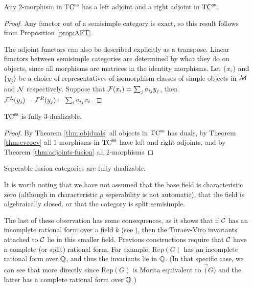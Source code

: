 \documentclass{amsart}
\begin{document}
\begin{theorem} \label{thm:adjoints-fusion}
Any $2$-morphism in ${\mathrm{TC}^{\text{ss}}}$ has a left adjoint and a right adjoint in ${\mathrm{TC}^{\text{ss}}}$.
\end{theorem}
\begin{proof}
Any functor out of a semisimple category is exact, so this result follows from Proposition \ref{prop:AFT}.

The adjoint functors can also be described explicitly as a transpose.  Linear functors between semisimple categories are determined by what they do on objects, since all morphisms are matrices in the identity morphisms.  Let $\{x_i\}$ and $\{y_j\}$ be a choice of representatives of isomorphism classes of simple objects in $\mathcal M$ and $\mathcal N$ respectively.  Suppose that $\mathcal F(x_i) = \sum_j a_{ij} y_j$, then $\mathcal F^L(y_j) = \mathcal F^R(y_j) = \sum_i a_{ij} x_i$. 
\end{proof}

\begin{corollary}  \label{cor:TC-dualizable}
 ${\mathrm{TC}^{\text{ss}}}$ is fully 3-dualizable.
\end{corollary}
\begin{proof}
By Theorem \ref{thm:objduals} all objects in ${\mathrm{TC}^{\text{ss}}}$ has duals, by Theorem \ref{thm:evcoev} all $1$-morphisms in ${\mathrm{TC}^{\text{ss}}}$ have left and right adjoints, and by Theorem \ref{thm:adjoints-fusion} all $2$-morphisms  
\end{proof}

\begin{corollary}
Seperable fusion categories are fully dualizable.
\end{corollary}

\begin{remark}
It is worth noting that we have not assumed that the base field is characteristic zero (although in characteristic $p$ seperability is not automatic), that the field is algebraically closed, or that the category is split semisimple.  

The last of these observation has some consequences, as it shows that if $\mathcal C$ has an incomplete rational form over a field $k$ (see \cite{???}), then the Turaev-Viro invariants attached to $\mathcal C$ lie in this smaller field.  Previous constructions require that $\mathcal C$ have a complete (or split) rational form.  For example, $\mathrm{Rep}(G)$ has an incomplete rational form over $\mathbb Q$, and thus the invariants lie in $\mathbb Q$.  (In that specific case, we can see that more directly since $\mathrm{Rep}(G)$ is Morita equivalent to $\Vec(G)$ and the latter has a complete rational form over $\mathbb Q$.)
\end{remark}
\end{document}
